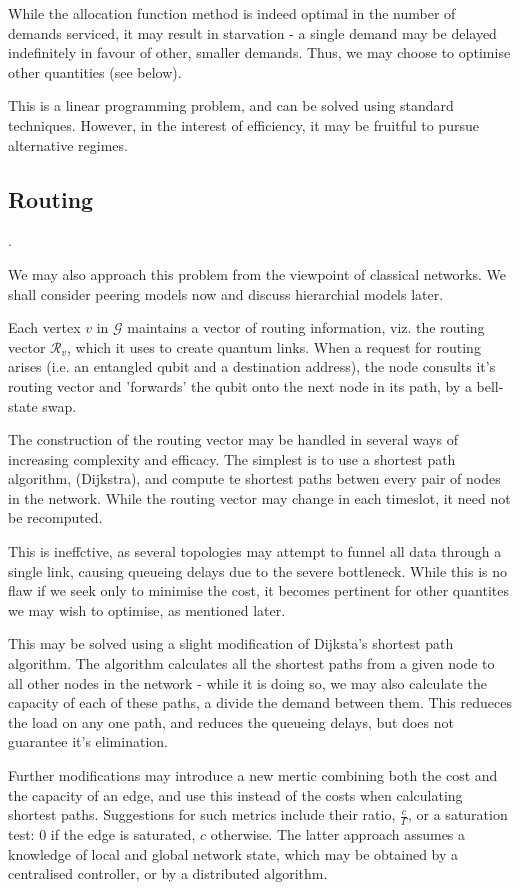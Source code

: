 \documentclass{amsart}
\begin{document}
    While the allocation function method is indeed optimal in the number of demands serviced, it may result in starvation - a single demand may be delayed indefinitely in favour of other, smaller demands. Thus, we may choose to optimise other quantities (see below).

    This is a linear programming problem, and can be solved using standard techniques. However, in the interest of efficiency, it may be fruitful to pursue alternative regimes.

    \subsection{Routing}.

    We may also approach this problem from the viewpoint of classical networks. We shall consider peering models now and discuss hierarchial models later. 

    Each vertex \(v\) in \(\mathcal{G}\) maintains a vector of routing information, viz. the routing vector \(\mathcal{R}_v\), which it uses to create quantum links. When a request for routing arises (i.e. an entangled qubit and a destination address), the node consults it's routing vector and 'forwards' the qubit onto the next node in its path, by a bell-state swap. 

    The construction of the routing vector may be handled in several ways of increasing complexity and efficacy. The simplest is to use a shortest path algorithm, (Dijkstra), and compute te shortest paths betwen every pair of nodes in the network. While the routing vector may change in each timeslot, it need not be recomputed. 
    
    This is ineffctive, as several topologies may attempt to funnel all data through a single link, causing queueing delays due to the severe bottleneck. While this is no flaw if we seek only to minimise the cost, it becomes pertinent for other quantites we may wish to optimise, as mentioned later.

    This may be solved using a slight modification of Dijksta's shortest path algorithm. The algorithm calculates all the shortest paths from a given node to all other nodes in the network - while it is doing so, we may also calculate the capacity of each of these paths, a divide the demand between them. This redueces the load on any one path, and reduces the queueing delays, but does not guarantee it's elimination.

    Further modifications may introduce a new mertic combining both the cost and the capacity of an edge, and use this instead of the costs when calculating shortest paths. Suggestions for such metrics include their ratio, \(\frac{c}{\Gamma}\), or a saturation test: 0 if the edge is saturated, \(c\) otherwise. The latter approach assumes a knowledge of local and global network state, which may be obtained by a centralised controller, or by a distributed algorithm. 
\end{document}
